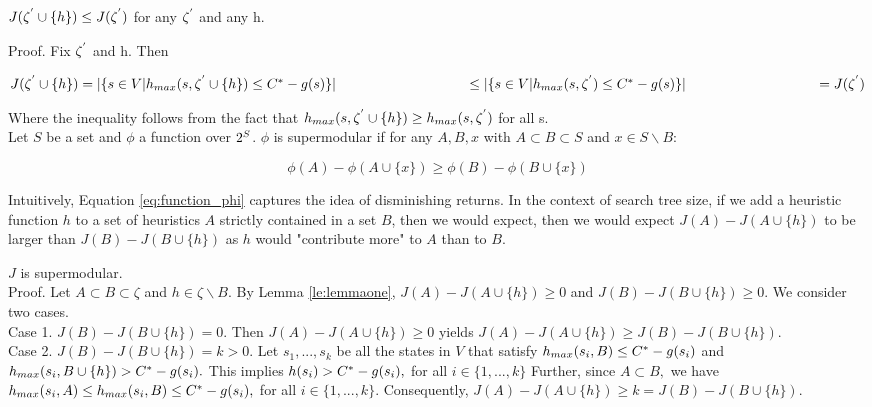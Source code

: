 \begin{lemma}
$J(\zeta\sp{'} \cup \{h\}) \leq J(\zeta\sp{'})$ for any $\zeta\sp{'}$ and any h.

Proof. Fix $\zeta\sp{'}$ and h. Then

$J(\zeta\sp{'} \cup \{h\})  =  |\{s \in V | h_{max}(s, \zeta\sp{'} \cup \{h\}) \leq C\sp{*} - g(s)\}|\\
\hspace*{3.3cm} \leq  |\{s \in V | h_{max}(s,\zeta\sp{'}) \leq C\sp{*} - g(s)\}|\\
\hspace*{3.3cm} = J(\zeta\sp{'}) $

Where the inequality follows from the fact that $h_{max}(s,\zeta\sp{'} \cup \{h\}) \geq h_{max}(s,\zeta\sp{'})$ for all s. \\

Let $S$ be a set and $\phi$ a function over $2\sp{S}$. $\phi$ is supermodular if for any $A, B, x$ with $A \subset B \subset S$ and $x \in S \backslash B:$

\begin{equation}
\phi(A) - \phi(A \cup \{x\}) \geq \phi(B) - \phi(B \cup \{x\})
\label{eq:function_phi}
\end{equation}

Intuitively, Equation \ref{eq:function_phi} captures the idea of disminishing returns. In the context of search tree size, if we add a heuristic function $h$ to a set of heuristics $A$ strictly contained in a set $B$, then we would expect, then we would expect $J(A) - J(A \cup \{h\})$ to be larger than $J(B) - J(B \cup \{h\})$ as $h$ would "contribute more" to $A$ than to $B$.
\label{le:lemmaone}
\end{lemma}

\begin{lemma}
$J$ is supermodular. \\
Proof. Let $A \subset B \subset \zeta$ and $h \in \zeta \backslash B.$ By Lemma \ref{le:lemmaone}, $J(A) - J(A \cup \{h\}) \geq 0$ and $J(B) - J(B \cup \{h\}) \geq 0$. We consider two cases.\\
Case 1. $J(B) - J(B \cup \{h\}) = 0.$ Then $J(A) - J(A \cup \{h\}) \geq 0$ yields $J(A) - J(A \cup \{h\}) \geq J(B) - J(B \cup \{h\})$.\\
Case 2. $J(B) - J(B \cup \{h\}) = k > 0.$ Let $s_{1},...,s_{k}$ be all the states in $V$ that satisfy $h_{max}(s_{i}, B) \leq  C\sp{*} - g(s_{i})$ and $h_{max}(s_{i}, B \cup \{h\}) > C\sp{*} - g(s_{i}).$  This implies $h(s_{i}) > C\sp{*} - g(s_{i}),$ for all $i \in \{1,...,k\}$ Further, since $A \subset B,$ we have $h_{max}(s_{i}, A) \leq h_{max}(s_{i},B) \leq C\sp{*} - g(s_{i}),$ for all $i \in \{1,...,k\}.$ Consequently, $J(A) - J(A \cup \{h\}) \geq k = J(B) - J(B \cup \{h\}).$
\end{lemma}

